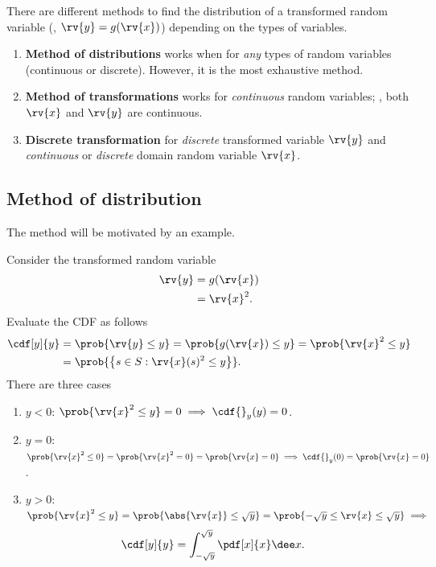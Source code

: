There are different methods to find the distribution of a transformed random variable (\ie, $\rv{y}=g(\rv{x})$) depending on the types of variables.
\begin{enumerate}
    \item \textbf{Method of distributions} works when for \emph{any} types of random variables (continuous or discrete). However, it is the most exhaustive method.
    \item \textbf{Method of transformations} works for \emph{continuous} random variables; \ie, both $\rv{x}$ and $\rv{y}$ are continuous.
    \item \textbf{Discrete transformation} for \emph{discrete} transformed variable $\rv{y}$ and \emph{continuous} or \emph{discrete} domain random variable $\rv{x}$.
\end{enumerate}

\subsection{Method of distribution}
The method will be motivated by an example. 
\begin{example}
    Consider the transformed random variable
    \begin{align}
        \rv{y} 
        &= g(\rv{x})\\
        &= \rv{x}^{2}.
    \end{align}
    Evaluate the CDF as follows
    \begin{align}
        \cdf[y]{y} &= \prob{\rv{y}\leq y} = \prob{g(\rv{x})\leq y} = \prob{\rv{x}^2\leq y}\\
        &= \prob{\left\{ s\in S : \rv{x}(s)^{2}\leq y\right\}}.
    \end{align}
    There are three cases
    \begin{enumerate}
        \item $y<0$: $\prob{\rv{x}^{2}\leq y} = 0 \implies \cdf{}_{y}(y) = 0$.
        \item $y=0$: $\prob{\rv{x}^{2}\leq 0} = \prob{\rv{x}^{2}=0} = \prob{\rv{x}=0} \implies \cdf{}_{y}(0)=\prob{\rv{x}=0}$.
        \item $y>0$: $\prob{\rv{x}^{2}\leq y} = \prob{\abs{\rv{x}}\leq \sqrt{y}} = \prob{-\sqrt{y}\leq \rv{x} \leq\sqrt{y}}\implies$
        \begin{align}
            \cdf[y]{y} &= \int_{-\sqrt{y}}^{\sqrt{y}} \pdf[x]{x}\dee x.            
    \end{align}
    \end{enumerate}
\end{example}

